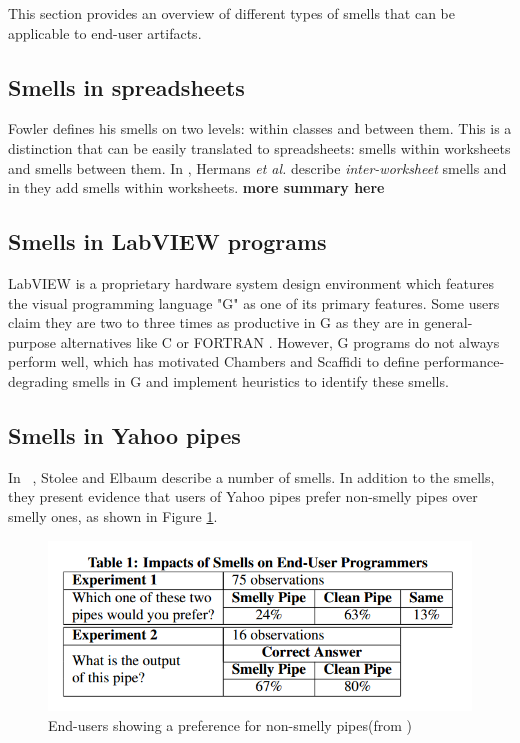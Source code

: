 \documentclass[10pt,conference,compsocconf]{IEEEtran}
\newcommand{\todo}[1]{\textbf{#1}}
\begin{document}
This section provides an overview of different types of smells that can be applicable to end-user artifacts.

\subsection{Smells in spreadsheets}
Fowler defines his smells on two levels: within classes and between them. This is a distinction that can be easily translated to spreadsheets: smells within worksheets and smells between them. In \cite{Hermans2012-2}, Hermans \emph{et al.} describe \emph{inter-worksheet} smells and in \cite{Hermans2012} they add smells within worksheets.
\todo{more summary here}

\subsection{Smells in LabVIEW programs}

LabVIEW is a proprietary hardware system design environment which features the visual programming language "G" as one of its primary features.
Some users claim they are two to three times as productive in G as they are in general-purpose alternatives like C or FORTRAN \cite{chambers2013smell}.
However, G programs do not always perform well, which has motivated Chambers and Scaffidi \cite{chambers2013smell} to define performance-degrading smells in G and implement heuristics to identify these smells.



\subsection{Smells in Yahoo pipes}
In ~\cite{Stolee2011}, Stolee and Elbaum describe a number of smells. In addition to the smells, they present evidence that users of Yahoo pipes prefer non-smelly pipes over smelly ones, as shown in Figure \ref{fig:Table1-Stolee2011}.

\begin{figure}[ht!]
\centering
\includegraphics[width=\columnwidth]{Table1-Stolee2011.png}
\caption{End-users showing a preference for non-smelly pipes(from \cite{Stolee2011})}
\label{fig:Table1-Stolee2011}
\end{figure}
\end{document}
